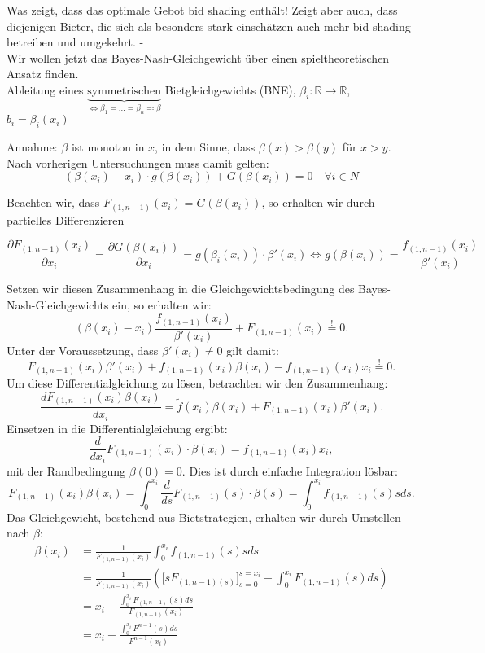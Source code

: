 \documentclass[12pt]{extreport} %
\theoremstyle{named}
\theoremstyle{nnamed}
\theoremstyle{itshape}
\theoremstyle{normal}
\begin{document}
Was zeigt, dass das optimale Gebot bid shading enthält! Zeigt aber auch, dass diejenigen Bieter, die sich als besonders stark einschätzen auch mehr bid shading betreiben und umgekehrt. -\\

Wir wollen jetzt das Bayes-Nash-Gleichgewicht über einen spieltheoretischen Ansatz finden.  \\

Ableitung eines $\underbrace{\text{symmetrischen}}_{\iff \beta_{1} = \dotsc = \beta_{n} \eqqcolon \beta}$ Bietgleichgewichts (BNE), $\beta_{i} \colon \mathbb{R} \rightarrow \mathbb{R}$, $b_{i} = \beta_{i}(x_{i})$

Annahme: $\beta$ ist monoton in $x$, in dem Sinne, dass $\beta(x) > \beta(y)$ für $x > y$. ~\\

Nach vorherigen Untersuchungen muss damit gelten:
$$ \left( \beta(x_i) - x_{i} \right) \cdot g(\beta(x_{i})) + G(\beta(x_{i}))  = 0 \quad \forall i \in N $$

Beachten wir, dass $F_{(1,n-1)}(x_{i}) = G(\beta(x_{i}))$, so erhalten wir durch partielles Differenzieren

$$ \frac{\partial F_{(1,n-1)}(x_{i})}{\partial x_{i}} = \frac{\partial G(\beta(x_{i}))}{\partial x_{i}} = g(\beta_{i}(x_{i})) \cdot \beta'(x_{i}) \iff g(\beta(x_{i})) = \frac{f_{(1, n-1)}(x_{i})}{\beta'(x_{i})} $$

Setzen wir diesen Zusammenhang in die Gleichgewichtsbedingung des Bayes-Nash-Gleichgewichts ein, so erhalten wir:  $$(\beta(x_{i}) - x_{i}) \frac{f_{(1, n-1)}(x_{i})}{\beta'(x_{i})} + F_{(1,n-1)}(x_{i}) \overset{!}{=} 0.$$
Unter der Voraussetzung, dass $\beta'(x_i) \neq 0$ gilt damit:
$$ F_{(1, n-1)}(x_{i}) \beta'(x_{i}) + f_{(1, n-1)}(x_{i}) \beta(x_{i}) - f_{(1, n-1)}(x_{i}) x_{i} \overset{!}{=} 0. $$
Um diese Differentialgleichung zu lösen, betrachten wir den Zusammenhang:
$$ \frac{d F_{(1,n-1)}(x_{i}) \beta(x_{i})}{d x_{i}} = \tilde{f}(x_{i}) \beta(x_{i}) + F_{(1, n-1)}(x_{i}) \beta'(x_{i}). $$
Einsetzen in die Differentialgleichung ergibt:
$$ \frac{d}{dx_{i}} F_{(1,n-1)}(x_{i}) \cdot \beta(x_{i}) = f_{(1, n-1)}(x_{i}) x_{i}, $$
mit der Randbedingung $\beta(0) = 0$. Dies ist durch  einfache Integration lösbar:
$$ F_{(1, n-1)}(x_{i}) \beta(x_{i}) = \int_{0}^{x_{i}} \frac{d}{ds} F_{(1,n-1)}(s) \cdot \beta(s) = \int_{0}^{x_{i}}  f_{(1, n-1)}(s) s ds. $$
Das Gleichgewicht, bestehend aus Bietstrategien, erhalten wir durch Umstellen nach $\beta$:
\begin{align*}
	\beta(x_{i}) & = \frac{1}{F_{(1, n-1)}(x_{i})}  \int_{0}^{x_{i}}  f_{(1, n-1)}(s) s ds \\
	& = \frac{1}{F_{(1, n-1)}(x_{i})} \left( \big[ s F_{(1,n-1)(s)} \big]_{s=0}^{s=x_{i}} - \int_{0}^{x_{i}}  F_{(1, n-1)}(s)  ds \right) \\
	& = x_{i} - \frac{\int_{0}^{x_{i}} F_{(1, n-1)}(s) ds}{F_{(1,n-1)}(x_{i})} \\
	& = x_{i} - \frac{\int_{0}^{x_{i}} F^{n-1}(s) ds}{F^{n-1}(x_{i})} 
\end{align*}
\end{document}
